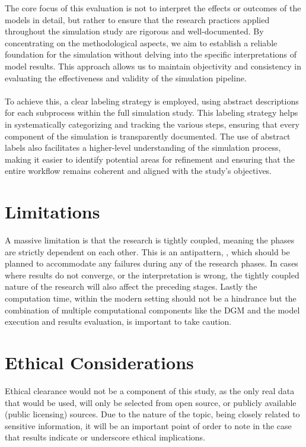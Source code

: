 The core focus of this evaluation is not to interpret the effects or outcomes of the models in detail, but rather to ensure that the research practices applied throughout the simulation study are rigorous and well-documented. By concentrating on the methodological aspects, we aim to establish a reliable foundation for the simulation without delving into the specific interpretations of model results. This approach allows us to maintain objectivity and consistency in evaluating the effectiveness and validity of the simulation pipeline.
\\\\
\noindent To achieve this, a clear labeling strategy is employed, using abstract descriptions for each subprocess within the full simulation study. This labeling strategy helps in systematically categorizing and tracking the various steps, ensuring that every component of the simulation is transparently documented. The use of abstract labels also facilitates a higher-level understanding of the simulation process, making it easier to identify potential areas for refinement and ensuring that the entire workflow remains coherent and aligned with the study’s objectives.
    

\section{Limitations} \label{methlim}
A massive limitation is that the research is tightly coupled, meaning the phases are strictly dependent on each other. This is an antipattern, \parencite{joshi_beginning_2016}, which should be planned to accommodate any failures during any of the research phases. In cases where results do not converge, or the interpretation is wrong, the tightly coupled nature of the research will also affect the preceding stages. Lastly the computation time, within the modern setting should not be a hindrance but the combination of multiple computational components like the DGM and the model execution and results evaluation, is important to take caution. 

\section{Ethical Considerations}
Ethical clearance would not be a component of this study, as the only real data that would be used, will only be selected from open source, or publicly available (public licensing) sources. Due to the nature of the topic, being closely related to sensitive information, it will be an important point of order to note in the case that results indicate or underscore ethical implications.
